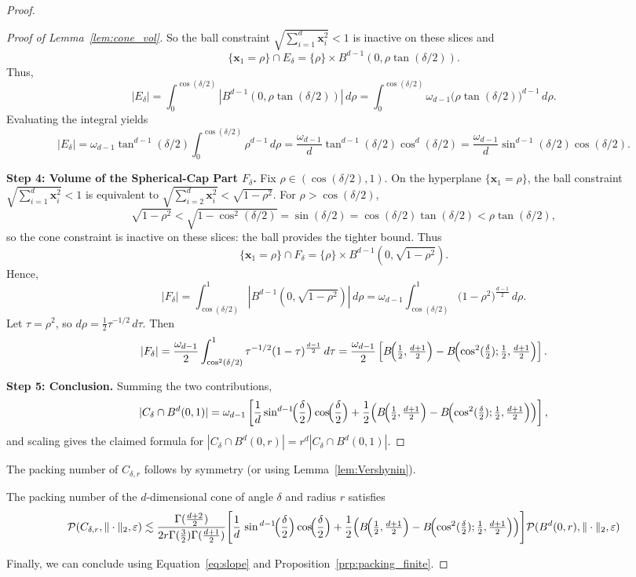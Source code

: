 \begin{proof}
\begin{proof}[Proof of Lemma~\ref{lem:cone_vol}]
So the ball constraint $\sqrt{\sum_{i=1}^d\mathbf x_i^2}<1$ is inactive on these slices and
\[
\{\mathbf x_1=\rho\}\cap E_\delta=\{\rho\}\times B^{d-1}(0,\rho\tan(\delta/2)).
\]
Thus,
\[
|E_\delta|
=\int_{0}^{\cos(\delta/2)} |B^{d-1}(0,\rho\tan(\delta/2))|\,d\rho
=\int_{0}^{\cos(\delta/2)} \omega_{d-1}\bigl(\rho\tan(\delta/2)\bigr)^{d-1}\,d\rho.
\]
Evaluating the integral yields
\[
|E_\delta|
=\omega_{d-1}\tan^{d-1}(\delta/2)\int_{0}^{\cos(\delta/2)}\rho^{d-1}\,d\rho
=\frac{\omega_{d-1}}{d}\tan^{d-1}(\delta/2)\cos^d(\delta/2)
=\frac{\omega_{d-1}}{d}\sin^{d-1}(\delta/2)\cos(\delta/2).
\]

\textbf{Step 4: Volume of the Spherical-Cap Part $F_\delta$.}
Fix $\rho\in(\cos(\delta/2),1)$. On the hyperplane $\{\mathbf x_1=\rho\}$, the ball constraint $\sqrt{\sum_{i=1}^d\mathbf x_i^2}<1$
is equivalent to $\sqrt{\sum_{i=2}^d\mathbf x_i^2}<\sqrt{1-\rho^2}$. For $\rho>\cos(\delta/2)$,
\[
\sqrt{1-\rho^2}<\sqrt{1-\cos^2(\delta/2)}=\sin(\delta/2)=\cos(\delta/2)\tan(\delta/2)
<\rho\tan(\delta/2),
\]
so the cone constraint is inactive on these slices: the ball provides the tighter bound.
Thus
\[
\{\mathbf x_1=\rho\}\cap F_\delta=\{\rho\}\times B^{d-1}(0,\sqrt{1-\rho^2}).
\]
Hence,
\[
|F_\delta|
=\int_{\cos(\delta/2)}^{1}|B^{d-1}(0,\sqrt{1-\rho^2})|\,d\rho
=\omega_{d-1}\int_{\cos(\delta/2)}^{1}\bigl(1-\rho^2\bigr)^{\frac{d-1}{2}}\,d\rho.
\]
Let $\tau=\rho^2$, so $d\rho=\frac{1}{2}\tau^{-1/2}\,d\tau$. Then
\[
|F_\delta|
=\frac{\omega_{d-1}}{2}\int_{\cos^2(\delta/2)}^{1}\tau^{-1/2}(1-\tau)^{\frac{d-1}{2}}\,d\tau
=\frac{\omega_{d-1}}{2}\left[
B\!\Bigl(\tfrac12,\tfrac{d+1}{2}\Bigr)
- B\!\Bigl(\cos^2(\tfrac{\delta}{2});\tfrac12,\tfrac{d+1}{2}\Bigr)
\right].
\]

\textbf{Step 5: Conclusion.}
Summing the two contributions,
\[
|C_\delta\cap B^d(0,1)|
=\omega_{d-1}\left[
\frac{1}{d}\sin^{d-1}\!\Bigl(\frac{\delta}{2}\Bigr)\cos\!\Bigl(\frac{\delta}{2}\Bigr)
+\frac{1}{2}\Bigl(B\!\Bigl(\tfrac12,\tfrac{d+1}{2}\Bigr)-B\!\Bigl(\cos^2(\tfrac{\delta}{2});\tfrac12,\tfrac{d+1}{2}\Bigr)\Bigr)
\right],
\]
and scaling gives the claimed formula for $|C_\delta\cap B^d(0,r)|=r^d|C_\delta\cap B^d(0,1)|$.
\end{proof}

The packing number of $C_{\delta,r}$ follows by symmetry (or using Lemma~\ref{lem:Vershynin}).

\begin{corollary}\label{cor:cone_pak}
    The packing number of the $d$-dimensional cone of angle $\delta$ and radius $r$ satisfies
    \[
    \mathcal{P}(C_{\delta,r}, \|\cdot\|_2,\varepsilon)\lesssim\frac{\Gamma(\frac{d+2}2)} {2r\Gamma(\frac{3}2)\Gamma(\frac{d+1}2)}
    \Bigg[\frac{1}{d}\,\sin^{\,d-1}\!\Bigl(\frac{\delta}{2}\Bigr)\cos\!\Bigl(\frac{\delta}{2}\Bigr)
+\frac{1}{2}\Bigl(B\!\Bigl(\tfrac12,\tfrac{d+1}{2}\Bigr)-B\!\Bigl(\cos^2(\tfrac{\delta}{2});\tfrac12,\tfrac{d+1}{2}\Bigr)\Bigr)\Bigg]\mathcal{P}(B^d(0,r), \|\cdot\|_2,\varepsilon)
    \]
\end{corollary}

Finally, we can conclude using Equation~\ref{eq:slope} and Proposition~\ref{prp:packing_finite}.

\end{proof}

